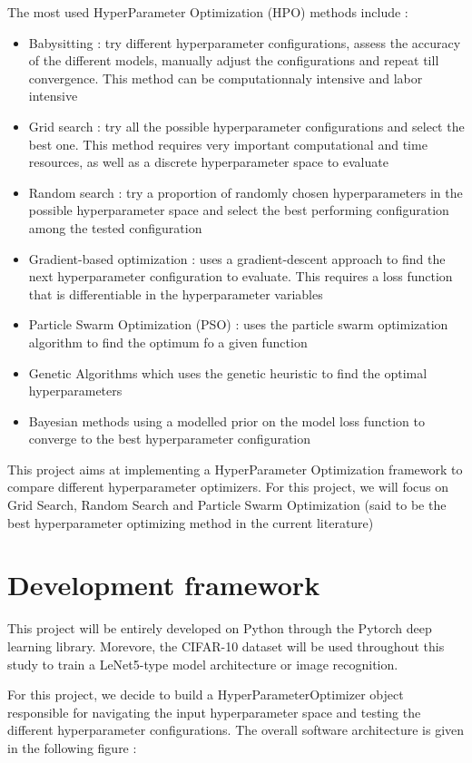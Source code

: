 \documentclass[a4 paper,11pt,2]{article}
\begin{document}
The most used HyperParameter Optimization (HPO) methods include : 
\begin{itemize}
\item Babysitting : try different hyperparameter configurations, assess the accuracy of the different models, manually adjust the configurations and repeat till convergence. This method can be computationnaly intensive and labor intensive
\item Grid search : try all the possible hyperparameter configurations and select the best one. This method requires very important computational and time resources, as well as a discrete hyperparameter space to evaluate
\item Random search : try a proportion of randomly chosen hyperparameters in the possible hyperparameter space and select the best performing configuration among the tested configuration
\item Gradient-based optimization : uses a gradient-descent approach to find the next hyperparameter configuration to evaluate. This requires a loss function that is differentiable in the hyperparameter variables
\item Particle Swarm Optimization (PSO) : uses the particle swarm optimization algorithm to find the optimum fo a given function
\item Genetic Algorithms which uses the genetic heuristic to find the optimal hyperparameters
\item Bayesian methods using a modelled prior on the model loss function to converge to the best hyperparameter configuration
\end{itemize}

This project aims at implementing a HyperParameter Optimization framework to compare different hyperparameter optimizers. For this project, we will focus on Grid Search, Random Search and Particle Swarm Optimization (said to be the best hyperparameter optimizing method in the current literature)

\section{Development framework}

This project will be entirely developed on Python through the Pytorch deep learning library. Morevore, the CIFAR-10 dataset will be used throughout this study to train a LeNet5-type model architecture or image recognition.

For this project, we decide to build a HyperParameterOptimizer object responsible for navigating the input hyperparameter space and testing the different hyperparameter configurations. The overall software architecture is given in the following figure :
\end{document}
